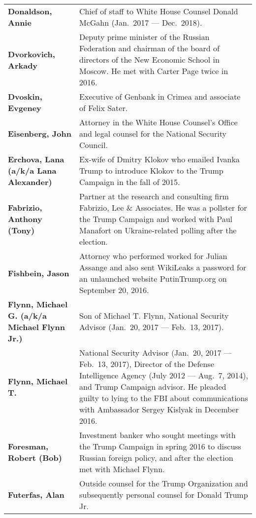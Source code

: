 \begin{longtable}{ p{} p{} }
    \textbf{Donaldson, Annie} & Chief of staff to White House Counsel Donald McGahn (Jan.~2017 — Dec.~2018). \\

    \textbf{Dvorkovich, Arkady} & Deputy prime minister of the Russian Federation and chairman of the board of directors of the New Economic School in Moscow. He met with Carter Page twice in 2016. \\

    \textbf{Dvoskin, Evgeney} & Executive of Genbank in Crimea and associate of Felix Sater. \\

    \textbf{Eisenberg, John} & Attorney in the White House Counsel’s Office and legal counsel for the National Security Council. \\

    \textbf{Erchova, Lana (a/k/a Lana Alexander)} & Ex-wife of Dmitry Klokov who emailed Ivanka Trump to introduce Klokov to the Trump Campaign in the fall of 2015. \\

    \textbf{Fabrizio, Anthony (Tony)} & Partner at the research and consulting firm Fabrizio, Lee \& Associates. He was a pollster for the Trump Campaign and worked with Paul Manafort on Ukraine-related polling after the election. \\

    \textbf{Fishbein, Jason} & Attorney who performed worked for Julian Assange and also sent WikiLeaks a password for an unlaunched website PutinTrump.org on September 20, 2016. \\

    \textbf{Flynn, Michael G. (a/k/a Michael Flynn Jr.)} & Son of Michael T. Flynn, National Security Advisor (Jan.~20, 2017 — Feb.~13, 2017). \\

    \textbf{Flynn, Michael T.} & National Security Advisor (Jan.~20, 2017 — Feb.~13, 2017), Director of the Defense Intelligence Agency (July 2012 — Aug.~7, 2014), and Trump Campaign advisor. He pleaded guilty to lying to the FBI about communications with Ambassador Sergey Kislyak in December 2016. \\

    \textbf{Foresman, Robert (Bob)} & Investment banker who sought meetings with the Trump Campaign in spring 2016 to discuss Russian foreign policy, and after the election met with Michael Flynn. \\

    \textbf{Futerfas, Alan} & Outside counsel for the Trump Organization and subsequently personal counsel for Donald Trump Jr. \\


\end{longtable}
